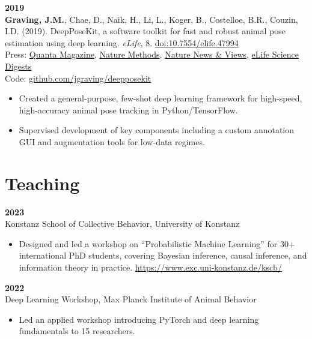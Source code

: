\documentclass[10pt,letterpaper]{article}
\begin{document}
	\vspace{4pt}
	\textbf{2019}\\
	\textbf{Graving, J.M.}, Chae, D., Naik, H., Li, L., Koger, B., Costelloe, B.R., Couzin, I.D. (2019). DeepPoseKit, a software toolkit for fast and robust animal pose estimation using deep learning. \textit{eLife}, 8. \href{https://doi.org/10.7554/elife.47994}{doi:10.7554/elife.47994} \\
	Press: \href{https://www.quantamagazine.org/to-decode-the-brain-scientists-automate-the-study-of-behavior-20191210/}{Quanta Magazine}, 
	\href{https://doi.org/10.1038/s41592-019-0678-2}{Nature Methods},
	\href{https://doi.org/10.1038/d41586-019-02942-5}{Nature News \& Views},
	\href{https://elifesciences.org/digests/47994/machine-learning-animal-poses-to-understand-behavior}{eLife Science Digests} \\
	Code: \href{https://github.com/jgraving/deepposekit}{github.com/jgraving/deepposekit}
	\begin{itemize}
		\item Created a general-purpose, few-shot deep learning framework for high-speed, high-accuracy animal pose tracking in Python/TensorFlow.
		\item Supervised development of key components including a custom annotation GUI and augmentation tools for low-data regimes.
	\end{itemize}
	
	\section*{Teaching}
	\textbf{2023}\\
	Konstanz School of Collective Behavior, University of Konstanz
	\begin{itemize}
		\item Designed and led a workshop on “Probabilistic Machine Learning” for 30+ international PhD students, covering Bayesian inference, causal inference, and information theory in practice. \href{https://www.exc.uni-konstanz.de/kscb/}{https://www.exc.uni-konstanz.de/kscb/}
	\end{itemize}
	
	\vspace{4pt}
	\textbf{2022}\\
	Deep Learning Workshop, Max Planck Institute of Animal Behavior
	\begin{itemize}
		\item Led an applied workshop introducing PyTorch and deep learning fundamentals to 15 researchers.
	\end{itemize}
	
\end{document}
